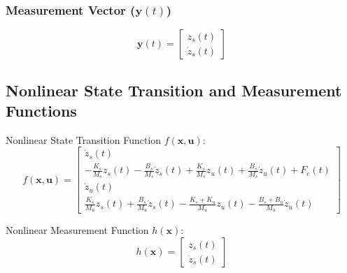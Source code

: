 \subsubsection {Measurement Vector (\( \mathbf{y}(t) \))}
\[
\mathbf{y}(t) = \begin{bmatrix}
	z_s(t) \\
	\dot{z}_s(t)
\end{bmatrix}
\]

\subsection {Nonlinear State Transition and Measurement Functions}

Nonlinear State Transition Function \( f(\mathbf{x}, \mathbf{u}) \):
\[
f(\mathbf{x}, \mathbf{u}) = \begin{bmatrix}
	\dot{z}_s(t) \\
	-\frac{K_s}{M_s} z_s(t) - \frac{B_s}{M_s} \dot{z}_s(t) + \frac{K_s}{M_s} z_u(t) + \frac{B_s}{M_s} \dot{z}_u(t) + F_c(t) \\
	\dot{z}_u(t) \\
	\frac{K_s}{M_u} z_s(t) + \frac{B_s}{M_u} \dot{z}_s(t) - \frac{K_s + K_u}{M_u} z_u(t) - \frac{B_s + B_u}{M_u} \dot{z}_u(t)
\end{bmatrix}
\]

Nonlinear Measurement Function \( h(\mathbf{x}) \):
\[
h(\mathbf{x}) = \begin{bmatrix}
	z_s(t) \\
	\dot{z}_s(t)
\end{bmatrix}
\]
